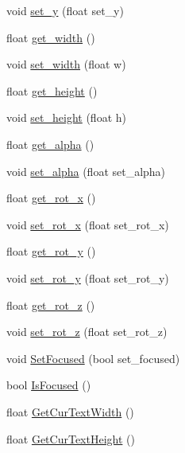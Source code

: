\begin{DoxyCompactItemize}
\item 
void \hyperlink{class_n_g_u_i_symbol_inst_a47fe106e686ce5a7a4651e0db73595c5}{set\+\_\+y} (float set\+\_\+y)
\item 
float \hyperlink{class_n_g_u_i_symbol_inst_a4a79d60bb5d8752b070266203810e9e6}{get\+\_\+width} ()
\item 
void \hyperlink{class_n_g_u_i_symbol_inst_a420a511551d1b8c70f0beea1bdde450e}{set\+\_\+width} (float w)
\item 
float \hyperlink{class_n_g_u_i_symbol_inst_a8bb9dd269a5457c618088b3cca61fe3c}{get\+\_\+height} ()
\item 
void \hyperlink{class_n_g_u_i_symbol_inst_a5c61ada6b62fe4c7fa1e9308ba62230a}{set\+\_\+height} (float h)
\item 
float \hyperlink{class_n_g_u_i_symbol_inst_a98426f8bd88470348929e7576f5faed5}{get\+\_\+alpha} ()
\item 
void \hyperlink{class_n_g_u_i_symbol_inst_a04185d4ab2b317522ae52b5bbc62233f}{set\+\_\+alpha} (float set\+\_\+alpha)
\item 
float \hyperlink{class_n_g_u_i_symbol_inst_a78f075fdcbcd73c406369819a727f4aa}{get\+\_\+rot\+\_\+x} ()
\item 
void \hyperlink{class_n_g_u_i_symbol_inst_a5ab8b1292bed19938791c692383f186a}{set\+\_\+rot\+\_\+x} (float set\+\_\+rot\+\_\+x)
\item 
float \hyperlink{class_n_g_u_i_symbol_inst_acc7a4df6b5644365363c09840e708acb}{get\+\_\+rot\+\_\+y} ()
\item 
void \hyperlink{class_n_g_u_i_symbol_inst_acaa73863f4b060b82990d2020806ec20}{set\+\_\+rot\+\_\+y} (float set\+\_\+rot\+\_\+y)
\item 
float \hyperlink{class_n_g_u_i_symbol_inst_a97720eb218543544e0a12d65e5f2df70}{get\+\_\+rot\+\_\+z} ()
\item 
void \hyperlink{class_n_g_u_i_symbol_inst_aeb99dce091d27b4a27cd76f3cb21b7b5}{set\+\_\+rot\+\_\+z} (float set\+\_\+rot\+\_\+z)
\item 
void \hyperlink{class_n_g_u_i_symbol_inst_aa4e719bf62817a9b66d0bd60d84c7485}{Set\+Focused} (bool set\+\_\+focused)
\item 
bool \hyperlink{class_n_g_u_i_symbol_inst_abf70a2daceb80c378bd2dbe5fc09f168}{Is\+Focused} ()
\item 
float \hyperlink{class_n_g_u_i_symbol_inst_afee9d0c2bd15d84655e826c0ab357493}{Get\+Cur\+Text\+Width} ()
\item 
float \hyperlink{class_n_g_u_i_symbol_inst_a7db23b1e1e65782f641edf92dd17507b}{Get\+Cur\+Text\+Height} ()

\end{DoxyCompactItemize}

